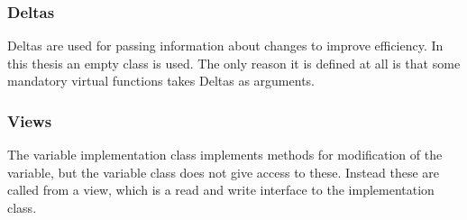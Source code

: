 \documentclass[a4paper,11pt]{article}
\begin{document}
\subsubsection{Deltas}
Deltas are used for passing information about changes to improve efficiency. In this thesis an empty class is used. The only reason it is defined at all is that some mandatory virtual functions takes Deltas as arguments.

\subsubsection{Views}
The variable implementation class implements methods for modification of the variable, but the variable class does not give access to these. Instead these are called from a view, which is a read and write interface to the implementation class.
\end{document}
